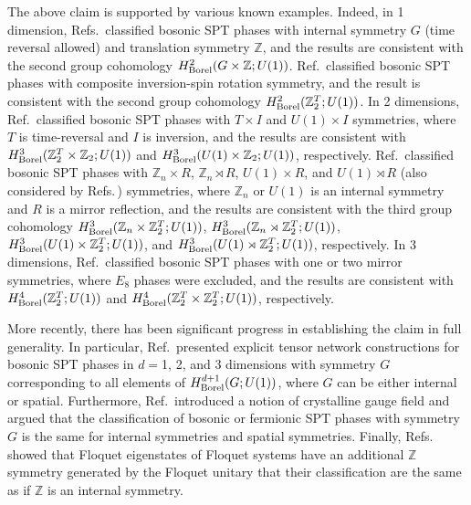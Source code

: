 \documentclass[sort&compress]{elsarticle}
\theoremstyle{theoremstyle}
\theoremstyle{framedtheoremstyle}
\theoremstyle{definitionstyle}
\theoremstyle{definitionstyle}
\theoremstyle{definitionstyle}
\theoremstyle{definitionstyle}
\theoremstyle{nameddefinitionstyle}
\theoremstyle{framednameddefinitionstyle}
\theoremstyle{proofstyle}
\theoremstyle{definitionstyle}
\newcommand{\ZZZ}{\mathbb{Z}}
\begin{document}
The above claim is supported by various known examples. Indeed, in 1 dimension, Refs.\,\cite{Wen_1d, Cirac, Wen_sgSPT_1d} classified bosonic SPT phases with internal symmetry $G$ (time reversal allowed) and translation symmetry $\ZZZ$, and the results are consistent with the second group cohomology $H^2_{\rm Borel}(G \times \ZZZ;U(1))$. Ref.\,\cite{SPt} classified bosonic SPT phases with composite inversion-spin rotation symmetry, and the result is consistent with the second group cohomology $H^2_{\rm Borel}(\ZZZ_2^T; U(1))$. In 2 dimensions, Ref.\,\cite{You_sgSPT} classified bosonic SPT phases with $T \times I$ and $U(1) \times I$ symmetries, where $T$ is time-reversal and $I$ is inversion, and the results are consistent with $H^3_{\rm Borel}(\ZZZ_2^T \times \ZZZ_2; U(1))$ and $H^3_{\rm Borel}(U(1) \times \ZZZ_2; U(1))$, respectively. Ref.\,\cite{Yoshida_sgSPT} classified bosonic SPT phases with $\ZZZ_n \times R$, $\ZZZ_n \rtimes R$, $U(1) \times R$, and $U(1) \rtimes R$ (also considered by Refs.\,\cite{Hsieh_sgSPT, Cho_sgSPT}) symmetries, where $\ZZZ_n$ or $U(1)$ is an internal symmetry and $R$ is a mirror reflection, and the results are consistent with the third group cohomology $H^3_{\rm Borel}(\ZZZ_n \times \ZZZ_2^T;U(1))$, $H^3_{\rm Borel}(\ZZZ_n \rtimes \ZZZ_2^T;U(1))$, $H^3_{\rm Borel}(U(1) \times \ZZZ_2^T;U(1))$, and $H^3_{\rm Borel}(U(1) \rtimes \ZZZ_2^T;U(1))$, respectively. In 3 dimensions, Ref.\,\cite{Hermele_torsor} classified bosonic SPT phases with one or two mirror symmetries, where $E_8$ phases were excluded, and the results are consistent with $H^4_{\rm Borel}(\ZZZ_2^T;U(1))$ and $H^4_{\rm Borel}(\ZZZ_2^T \times \ZZZ_2^T;U(1))$, respectively. 

More recently, there has been significant progress in establishing the claim in full generality. In particular, Ref.\,\cite{Jiang_sgSPT} presented explicit tensor network constructions for bosonic SPT phases in $d=$1, 2, and 3 dimensions with symmetry $G$ corresponding to all elements of $H^{d+1}_{\rm Borel}(G;U(1))$, where $G$ can be either internal or spatial. Furthermore, Ref.\,\cite{Thorngren_sgSPT} introduced a notion of crystalline gauge field and argued that the classification of bosonic or fermionic SPT phases with symmetry $G$ is the same for internal symmetries and spatial symmetries. Finally, Refs.\,\cite{Keyserlingk_Floquet, Else_Floquet, Potter_Floquet} showed that Floquet eigenstates of Floquet systems have an additional $\ZZZ$ symmetry generated by the Floquet unitary that their classification are the same as if $\ZZZ$ is an internal symmetry.
\end{document}
